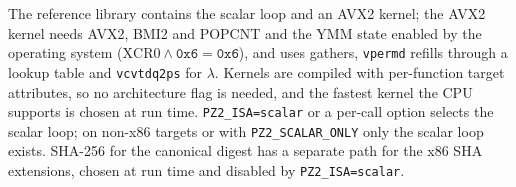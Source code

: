 The reference library contains the scalar loop and an AVX2 kernel; the AVX2 kernel needs AVX2,
BMI2 and POPCNT and the YMM state enabled by the operating system ($\mathrm{XCR0}\wedge\texttt{0x6}=\texttt{0x6}$), and
uses gathers, \texttt{vpermd} refills through a lookup table and \texttt{vcvtdq2ps} for $\lambda$. Kernels are
compiled with per-function target attributes, so no architecture flag is needed, and the fastest kernel the CPU
supports is chosen at run time. \texttt{PZ2\_ISA=scalar} or a per-call option selects the scalar loop; on non-x86 targets
or with \texttt{PZ2\_SCALAR\_ONLY} only the scalar loop exists. SHA-256 for the canonical digest has a separate path
for the x86 SHA extensions, chosen at run time and disabled by \texttt{PZ2\_ISA=scalar}.
